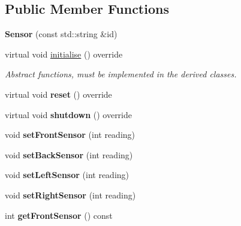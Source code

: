 \subsection*{Public Member Functions}
\begin{DoxyCompactItemize}
\item 
{\bfseries Sensor} (const std\+::string \&id)\hypertarget{class_sensor_a8615bafe3f2aa8f8b12b1199eaa577c4}{}\label{class_sensor_a8615bafe3f2aa8f8b12b1199eaa577c4}

\item 
virtual void \hyperlink{class_sensor_aa6175cacabc044409786f6d43a72ae29}{initialise} () override\hypertarget{class_sensor_aa6175cacabc044409786f6d43a72ae29}{}\label{class_sensor_aa6175cacabc044409786f6d43a72ae29}

\begin{DoxyCompactList}\small\item\em Abstract functions, must be implemented in the derived classes. \end{DoxyCompactList}\item 
virtual void {\bfseries reset} () override\hypertarget{class_sensor_a004fc50012f81dbfdce7a2541fa6130d}{}\label{class_sensor_a004fc50012f81dbfdce7a2541fa6130d}

\item 
virtual void {\bfseries shutdown} () override\hypertarget{class_sensor_a9b3ea7f61f41b68a4fb9141d887a7271}{}\label{class_sensor_a9b3ea7f61f41b68a4fb9141d887a7271}

\item 
void {\bfseries set\+Front\+Sensor} (int reading)\hypertarget{class_sensor_a232cfa2eba02b76485a79c056823add6}{}\label{class_sensor_a232cfa2eba02b76485a79c056823add6}

\item 
void {\bfseries set\+Back\+Sensor} (int reading)\hypertarget{class_sensor_ab473ccb1bf431fa351557c5c9de3dd42}{}\label{class_sensor_ab473ccb1bf431fa351557c5c9de3dd42}

\item 
void {\bfseries set\+Left\+Sensor} (int reading)\hypertarget{class_sensor_aa801b7317f2185df148903d99a421555}{}\label{class_sensor_aa801b7317f2185df148903d99a421555}

\item 
void {\bfseries set\+Right\+Sensor} (int reading)\hypertarget{class_sensor_af82bc6d823e34180bfcd6e4d33452d2c}{}\label{class_sensor_af82bc6d823e34180bfcd6e4d33452d2c}

\item 
int {\bfseries get\+Front\+Sensor} () const \hypertarget{class_sensor_a0e4445ad2a53389b593c0cc980cbd0fa}{}\label{class_sensor_a0e4445ad2a53389b593c0cc980cbd0fa}


\end{DoxyCompactItemize}
